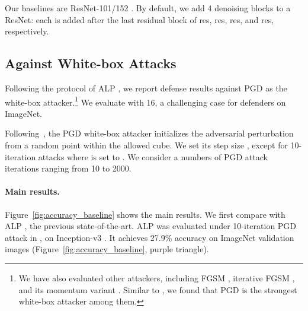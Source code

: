 \documentclass[10pt,twocolumn,letterpaper]{article}
\begin{document}
Our baselines are ResNet-101/152 \cite{He2016}.
By default, we add 4 denoising blocks to a ResNet: each is added after the last residual block of res, res, res, and res, respectively.

\subsection{Against White-box Attacks}
\label{subsec; white-box exp}

Following the protocol of ALP \cite{Kannan2018}, we report defense results against PGD as the white-box attacker.\footnote{We have also evaluated other attackers, including FGSM \cite{Goodfellow2015}, iterative FGSM \cite{Kurakin2017a}, and its momentum variant \cite{Dong2018}.
Similar to \cite{Kannan2018}, we found that PGD is the strongest white-box attacker among them.}
We evaluate with  16, a challenging case for defenders on ImageNet.

Following~\cite{Madry2018}, the PGD white-box attacker initializes the adversarial perturbation from a random point within the allowed  cube.
We set its step size , except for 10-iteration attacks where  is set to .
We consider a numbers of PGD attack iterations ranging from 10 to 2000. 

\paragraph{Main results.} Figure~\ref{fig:accuracy_baseline} shows the main results.
We first compare with ALP \cite{Kannan2018}, the previous state-of-the-art. ALP was evaluated under 10-iteration PGD attack in \cite{Kannan2018}, on Inception-v3 \cite{Szegedy2016a}. It achieves 27.9\% accuracy on ImageNet validation images (Figure~\ref{fig:accuracy_baseline}, purple triangle).

\begin{figure*}[t]
\centering
\vspace{-.5em}
\vspace{-1.5em}
\caption{\textbf{Defense against white-box attacks on ImageNet}. The left plot shows results against a white-box PGD attacker with 10 to \textbf{2000} attack iterations. The right plot zooms in on the results with 10 to 100 attack iterations.
The maximum perturbation is   16.
}
\label{fig:accuracy_baseline} 
\vspace{-.5em}
\end{figure*}
\end{document}
